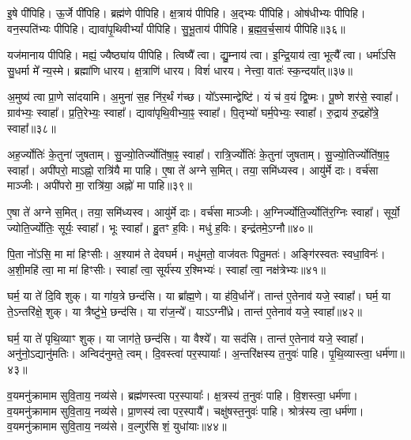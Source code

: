 इ॒षे पी॑पिहि। 
ऊ॒र्जे पी॑पिहि। 
ब्रह्म॑णे पीपिहि। 
क्ष॒त्राय॑ पीपिहि। 
अ॒द्भ्यः पी॑पिहि। 
ओष॑धीभ्यः पीपिहि। 
वन॒स्पति॑भ्यः पीपिहि। 
द्यावा॑पृ॒थिवीभ्यां᳚ पीपिहि। 
सु॒भू॒ताय॑ पीपिहि। 
ब्र॒ह्म॒व॒र्च॒साय॑ पीपिहि॥३६॥

यज॑मानाय पीपिहि। 
मह्यं॒ ज्यैष्ठ्या॑य पीपिहि। 
त्विष्यै᳚ त्वा। 
द्यु॒म्नाय॑ त्वा। 
इ॒न्द्रि॒याय॑ त्वा॒ भूत्यै᳚ त्वा। 
धर्मा॑ऽसि सु॒धर्मा मे᳚ न्य॒स्मे। 
ब्रह्मा॑णि धारय। 
क्ष॒त्राणि॑ धारय। 
विशं॑ धारय। 
नेत्त्वा॒ वातः॑ स्क॒न्दया᳚त्॥३७॥

अ॒मुष्य॑ त्वा प्रा॒णे सा॑दयामि। 
अ॒मुना॑ स॒ह नि॑र॒र्थं ग॑च्छ। 
यो᳚ऽस्मान्द्वेष्टि॑। 
यं च॑ व॒यं द्वि॒ष्मः। 
पू॒ष्णे शर॑से॒ स्वाहा᳚। 
ग्राव॑भ्यः॒ स्वाहा᳚। 
प्र॒ति॒रेभ्यः॒ स्वाहा᳚। 
द्यावा॑पृथि॒वीभ्या॒ꣴ॒ स्वाहा᳚। 
पि॒तृभ्यो॑ घर्म॒पेभ्यः॒ स्वाहा᳚। 
रु॒द्राय॑ रु॒द्रहो᳚त्रे॒ स्वाहा᳚॥३८॥

अह॒र्ज्योतिः॑ के॒तुना॑ जुषताम्। 
सु॒ज्यो॒तिर्ज्योति॑षा॒ꣴ॒ स्वाहा᳚। 
रात्रि॒र्ज्योतिः॑ के॒तुना॑ जुषताम्। 
सु॒ज्यो॒तिर्ज्योति॑षा॒ꣴ॒ स्वाहा᳚। 
अपी॑परो॒ माऽह्नो॒ रात्रि॑यै मा पाहि। 
ए॒षा ते॑ अग्ने स॒मित्। 
तया॒ समि॑ध्यस्व। 
आयु॑र्मे दाः। 
वर्च॑सा माञ्जीः। 
अपी॑परो मा॒ रात्रि॑या॒ अह्नो॑ मा पाहि॥३९॥

ए॒षा ते॑ अग्ने स॒मित्। 
तया॒ समि॑ध्यस्व। 
आयु॑र्मे दाः। 
वर्च॑सा माञ्जीः। 
अ॒ग्निर्ज्योति॒र्ज्योति॑र॒ग्निः स्वाहा᳚। 
सूर्यो॒ ज्योति॒र्ज्योतिः॒ सूर्यः॒ स्वाहा᳚। 
भूः स्वाहा᳚। 
हु॒तꣳ ह॒विः। 
मधु॑ ह॒विः। 
इन्द्र॑तमे॒ऽग्नौ॥४०॥

पि॒ता नो॑ऽसि॒ मा मा॑ हिꣳसीः। 
अ॒श्याम॑ ते देवघर्म। 
मधु॑मतो॒ वाज॑वतः पितु॒मतः॑। 
अङ्गि॑रस्वतः स्वधा॒विनः॑। 
अ॒शी॒महि॑ त्वा॒ मा मा॑ हिꣳसीः। 
स्वाहा᳚ त्वा॒ सूर्य॑स्य र॒श्मिभ्यः॑। 
स्वाहा᳚ त्वा॒ नक्ष॑त्रेभ्यः॥४१॥
\anuvakamend[ब्र॒ह्म॒व॒र्च॒साय॑ पीपिहि स्क॒न्दया᳚द्रु॒द्राय॑ रु॒द्रहो᳚त्रे॒ स्वाहाऽह्नो॑ मा पाह्य॒ग्नौ स॒प्त च॑]

घर्म॒ या ते॑ दि॒वि शुक्। 
या गा॑य॒त्रे छन्द॑सि। 
या ब्रा᳚ह्म॒णे। 
या ह॑वि॒र्धाने᳚। 
तान्त॑ ए॒तेनाव॑ यजे॒ स्वाहा᳚। 
घर्म॒ या ते॒ऽन्तरि॑क्षे॒ शुक्। 
या त्रैष्टु॑भे॒ छन्द॑सि। 
या रा॑ज॒न्ये᳚। 
याऽऽग्नी᳚ध्रे। 
तान्त॑ ए॒तेनाव॑ यजे॒ स्वाहा᳚॥४२॥

घर्म॒ या ते॑ पृथि॒व्याꣳ शुक्। 
या जाग॑ते॒ छन्द॑सि। 
या वैश्ये᳚। 
या सद॑सि। 
तान्त॑ ए॒तेनाव॑ यजे॒ स्वाहा᳚। 
अनु॑नो॒ऽद्यानु॑मतिः। 
अन्विद॑नुमते॒ त्वम्। 
दि॒वस्त्वा॑ पर॒स्पायाः᳚। 
अ॒न्तरि॑क्षस्य त॒नुवः॑ पाहि। 
पृ॒थि॒व्यास्त्वा॒ धर्म॑णा॥४३॥

व॒यमनु॑क्रामाम सुवि॒ताय॒ नव्य॑से। 
ब्रह्म॑णस्त्वा पर॒स्पायाः᳚। 
क्ष॒त्रस्य॑ त॒नुवः॑ पाहि। 
वि॒शस्त्वा॒ धर्म॑णा। 
व॒यमनु॑क्रामाम सुवि॒ताय॒ नव्य॑से। 
प्रा॒णस्य॑ त्वा पर॒स्पायै᳚। 
चक्षु॑षस्त॒नुवः॑ पाहि। 
श्रोत्र॑स्य त्वा॒ धर्म॑णा। 
व॒यमनु॑क्रामाम सुवि॒ताय॒ नव्य॑से। 
व॒ल्गुर॑सि शं॒ युधा॑याः॥४४॥

